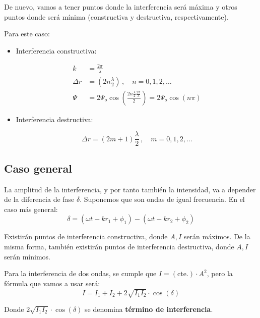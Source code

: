 \documentclass[a4paper]{book}
\numberwithin{figure}{chapter}
\numberwithin{equation}{chapter}
\begin{document}
De nuevo, vamos a tener puntos donde la interferencia será máxima y otros puntos donde será mínima (constructiva y destructiva, respectivamente).

Para este caso:
\begin{multicols}{2}
	\begin{itemize}
		\item Interferencia constructiva:
		      \begin{fleqn}
			      \begin{align*}
				      k        & =\frac{2\pi}{\lambda}                                                                                          \\
				      \Delta r & = \left( 2n\frac{\lambda}{2} \right) \, , \quad n = 0,1,2, \ldots                                              \\
				      \Psi     & = 2\Psi_o\cos\left( \frac{2n\frac{\lambda}{2}\frac{2\pi}{\lambda}}{2} \right) = 2\Psi_o\cos\left( n\pi \right)
			      \end{align*}
		      \end{fleqn}

		\item Interferencia destructiva:
		      \begin{fleqn}
			      \[\Delta r = \left( 2m+1 \right)\frac{\lambda}{2} \, ,\quad m=0,1,2,\ldots\]
		      \end{fleqn}
	\end{itemize}
\end{multicols}

\subsection{Caso general}

La amplitud de la interferencia, y por tanto también la intensidad, va a depender de la diferencia de fase $\delta$. Suponemos que son ondas de igual frecuencia. En el caso más general:
\[\delta = \left( \omega t - kr_1 + \phi_1 \right) - \left( \omega t - kr_2 + \phi_2 \right)\]

Existirán puntos de interferencia constructiva, donde $A,I$ serán máximos. De la misma forma, también existirán puntos de interferencia destructiva, donde $A,I$ serán mínimos.

Para la interferencia de dos ondas, se cumple que $I=(\text{cte.})\cdot A^2$, pero la fórmula que vamos a usar será:
\[\boxed{I=I_1+I_2+2\sqrt{I_1I_2} \cdot \cos\left( \delta \right)}\]

Donde $2\sqrt{I_1I_2} \cdot \cos\left( \delta \right)$ se denomina \textbf{término de interferencia}.
\end{document}
